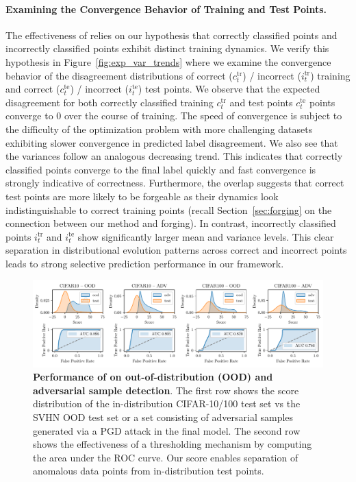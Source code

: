 \paragraph{Examining the Convergence Behavior of Training and Test Points.}

The effectiveness of \sptd relies on our hypothesis that correctly classified points and incorrectly classified points exhibit distinct training dynamics. We verify this hypothesis in Figure~\ref{fig:exp_var_trends} where we examine the convergence behavior of the disagreement distributions of correct ($c^\text{tr}_t$) / incorrect ($i^\text{tr}_t$) training and correct ($c^\text{te}_t$) / incorrect ($i^\text{te}_t$) test points. We observe that the expected disagreement for both correctly classified training $c^\text{tr}_t$ and test points $c^\text{te}_t$ points converge to $0$ over the course of training. The speed of convergence is subject to the difficulty of the optimization problem with more challenging datasets exhibiting slower convergence in predicted label disagreement. We also see that the variances follow an analogous decreasing trend. This indicates that correctly classified points converge to the final label quickly and fast convergence is strongly indicative of correctness. Furthermore, the overlap suggests that correct test points are more likely to be forgeable as their dynamics look indistinguishable to correct training points (recall Section~\ref{sec:forging} on the connection between our method and forging). In contrast, incorrectly classified points $i^\text{tr}_t$ and $i^\text{te}_t$ show significantly larger mean and variance levels. This clear separation in distributional evolution patterns across correct and incorrect points leads to strong selective prediction performance in our \sptd framework.

\label{sec:ts_exp}
\begin{figure}[t]
    \centering
    \includegraphics[width=\linewidth]{figs/sptd/adv_ood.pdf}
    \caption[Performance of \sptd on out-of-distribution (OOD) and adversarial sample detection.]{\textbf{Performance of \sptd on out-of-distribution (OOD) and adversarial sample detection}. The first row shows the score distribution of the in-distribution CIFAR-10/100 test set vs the SVHN OOD test set or a set consisting of adversarial samples generated via a PGD attack in the final model. The second row shows the effectiveness of a thresholding mechanism by computing the area under the ROC curve. Our score enables separation of anomalous data points from in-distribution test points.}
    \label{fig:adv_ood}
\end{figure}

